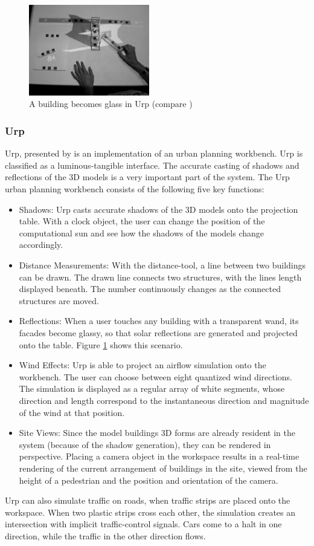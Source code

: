 \begin{figure}
\centering
\includegraphics[width=0.47\textwidth]{figures/urp.jpg}
\caption{A building becomes glass in Urp (compare \protect\cite{underkoffler99})}
\label{fig:urp}
\end{figure}

\subsubsection{Urp}
Urp, presented by \cite{underkoffler99} is an implementation of an urban planning workbench. Urp is classified as a luminous-tangible interface. The accurate casting of shadows and reflections of the 3D models is a very important part of the system. The Urp urban planning workbench consists of the following five key functions:
\begin{itemize}
\item Shadows: Urp casts accurate shadows of the 3D models onto the projection table. With a clock object, the user can change the position of the computational sun and see how the shadows of the models change accordingly. 
\item Distance Measurements: With the distance-tool, a line between two buildings can be drawn. The drawn line connects two structures, with the lines length displayed beneath. The number continuously changes as the connected structures are moved. 
\item Reflections: When a user touches any building with a transparent wand, its facades become glassy, so that solar reflections are generated and projected onto the table. Figure \ref{fig:urp} shows this scenario.
\item Wind Effects: Urp is able to project an airflow simulation onto the workbench. The user can choose between eight quantized wind directions. The simulation is displayed as a regular array of white segments, whose direction and length correspond to the instantaneous direction and magnitude of the wind at that position.
\item Site Views: Since the model buildings 3D forms are already resident in the system (because of the shadow generation), they can be rendered in perspective. Placing a camera object in the workspace results in a real-time rendering of the current arrangement of buildings in the site, viewed from the height of a pedestrian and the position and orientation of the camera. 
\end{itemize}
Urp can also simulate traffic on roads, when traffic strips are placed onto the workspace. When two plastic strips cross each other, the simulation creates an intersection with implicit traffic-control signals. Cars come to a halt in one direction, while the traffic in the other direction flows.

